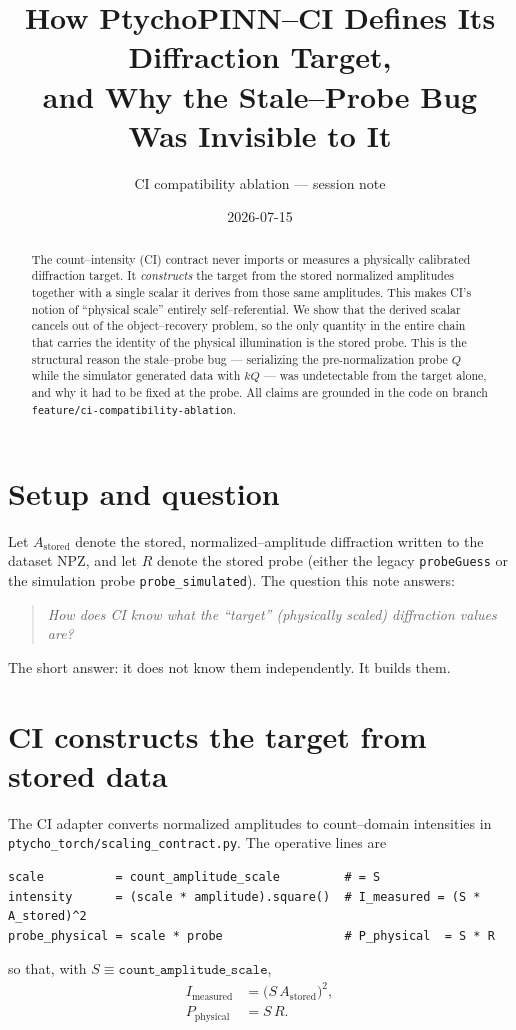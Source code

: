 \documentclass[11pt]{article}
\title{How PtychoPINN--CI Defines Its Diffraction Target,\\
and Why the Stale--Probe Bug Was Invisible to It}
\author{CI compatibility ablation --- session note}
\date{2026-07-15}
\newcommand{\Astored}{A_{\mathrm{stored}}}
\newcommand{\Imeas}{I_{\mathrm{measured}}}
\newcommand{\Pphys}{P_{\mathrm{physical}}}
\newcommand{\code}[1]{\texttt{#1}}
\begin{document}
\maketitle

\begin{abstract}
The count--intensity (CI) contract never imports or measures a physically
calibrated diffraction target. It \emph{constructs} the target from the stored
normalized amplitudes together with a single scalar it derives from those same
amplitudes. This makes CI's notion of ``physical scale'' entirely
self--referential. We show that the derived scalar cancels out of the
object--recovery problem, so the only quantity in the entire chain that
carries the identity of the physical illumination is the stored probe. This is
the structural reason the stale--probe bug --- serializing the pre-normalization
probe $Q$ while the simulator generated data with $kQ$ --- was undetectable
from the target alone, and why it had to be fixed at the probe.
All claims are grounded in the code on branch
\code{feature/ci-compatibility-ablation}.
\end{abstract}

\section{Setup and question}

Let $\Astored$ denote the stored, normalized--amplitude diffraction written to
the dataset NPZ, and let $R$ denote the stored probe (either the legacy
\code{probeGuess} or the simulation probe \code{probe\_simulated}). The question
this note answers:

\begin{quote}
\emph{How does CI know what the ``target'' (physically scaled) diffraction
values are?}
\end{quote}

The short answer: it does not know them independently. It builds them.

\section{CI constructs the target from stored data}

The CI adapter converts normalized amplitudes to count--domain intensities in
\code{ptycho\_torch/scaling\_contract.py}. The operative lines are
\begin{verbatim}
scale          = count_amplitude_scale         # = S
intensity      = (scale * amplitude).square()  # I_measured = (S * A_stored)^2
probe_physical = scale * probe                 # P_physical  = S * R
\end{verbatim}
so that, with $S \equiv \code{count\_amplitude\_scale}$,
\begin{align}
\Imeas &= \bigl(S\,\Astored\bigr)^2, \label{eq:target}\\
\Pphys &= S\,R. \label{eq:pphys}
\end{align}
\end{document}
